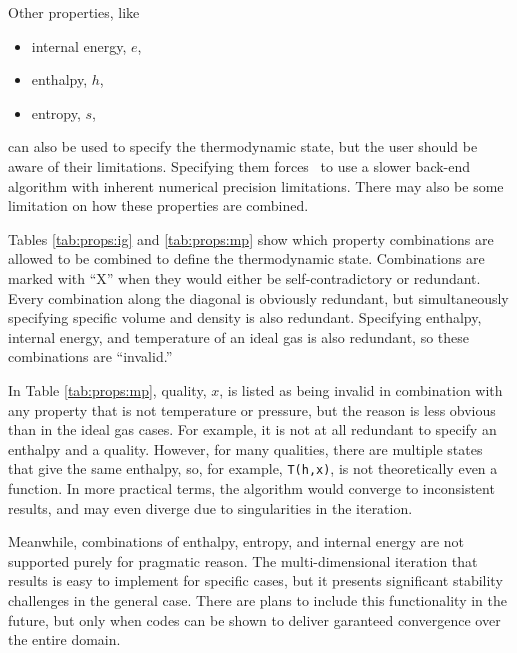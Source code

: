 Other properties, like 
\begin{itemize}
\item internal energy, $e$,
\item enthalpy, $h$, 
\item entropy, $s$,
\end{itemize}
can also be used to specify the thermodynamic state, but the user should be aware of their limitations.  Specifying them forces \PM\ to use a slower back-end algorithm with inherent numerical precision limitations.  There may also be some limitation on how these properties are combined.

Tables \ref{tab:props:ig} and \ref{tab:props:mp} show which property combinations are allowed to be combined to define the thermodynamic state.  Combinations are marked with ``X'' when they would either be self-contradictory or redundant.  Every combination along the diagonal is obviously redundant, but simultaneously specifying specific volume and density is also redundant.  Specifying enthalpy, internal energy, and temperature of an ideal gas is also redundant, so these combinations are ``invalid.''

In Table \ref{tab:props:mp}, quality, $x$, is listed as being invalid in combination with any property that is not temperature or pressure, but the reason is less obvious than in the ideal gas cases.  For example, it is not at all redundant to specify an enthalpy and a quality.  However, for many qualities, there are multiple states that give the same enthalpy, so, for example, \texttt{T(h,x)}, is not theoretically even a function.  In more practical terms, the algorithm would converge to inconsistent results, and may even diverge due to singularities in the iteration.

Meanwhile, combinations of enthalpy, entropy, and internal energy are not supported purely for pragmatic reason.  The multi-dimensional iteration that results is easy to implement for specific cases, but it presents significant stability challenges in the general case.  There are plans to include this functionality in the future, but only when codes can be shown to deliver garanteed convergence over the entire domain.

